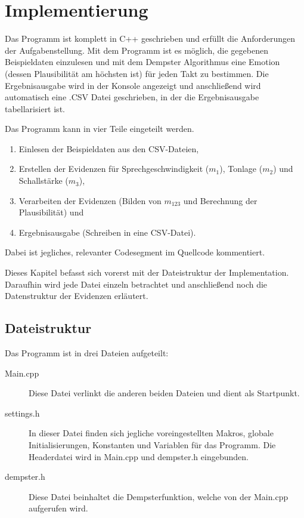 \chapter{Implementierung}
\label{implementation}
Das Programm ist komplett in C++ geschrieben und erfüllt die Anforderungen der Aufgabenstellung. Mit dem Programm ist es möglich, die gegebenen Beispieldaten einzulesen und mit dem Dempster Algorithmus eine Emotion (dessen Plausibilität am höchsten ist) für jeden Takt zu bestimmen. 
Die Ergebnisausgabe wird in der Konsole angezeigt und anschließend wird automatisch eine .CSV Datei geschrieben, in der die Ergebnisausgabe tabellarisiert ist. 


Das Programm kann in vier Teile eingeteilt werden.

\begin{enumerate}
  \item Einlesen der Beispieldaten aus den CSV-Dateien,
  \item Erstellen der Evidenzen für Sprechgeschwindigkeit (\(m_1\)), Tonlage (\(m_2\)) und Schallstärke (\(m_3\)),
  \item Verarbeiten der Evidenzen (Bilden von \(m_{123}\) und Berechnung der Plausibilität) und
  \item Ergebnisausgabe (Schreiben in eine CSV-Datei).
\end{enumerate}

Dabei ist jegliches, relevanter Codesegment im Quellcode kommentiert. 

Dieses Kapitel befasst sich vorerst mit der Dateistruktur der Implementation. Daraufhin wird jede Datei einzeln betrachtet und anschließend noch die Datenstruktur der Evidenzen erläutert.  

\section{Dateistruktur}
Das Programm ist in drei Dateien aufgeteilt:

\begin{description}
  \item [Main.cpp] Diese Datei verlinkt die anderen beiden Dateien und dient als Startpunkt. 
  \item [settings.h] In dieser Datei finden sich jegliche voreingestellten Makros, globale Initialisierungen, Konstanten und Variablen für das Programm. Die Headerdatei wird in Main.cpp und dempster.h eingebunden.
  \item [dempster.h] Diese Datei beinhaltet die Dempsterfunktion, welche von der Main.cpp aufgerufen wird.
  \end{description}

